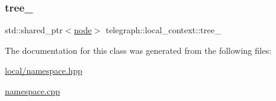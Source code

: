 \subsubsection{\texorpdfstring{tree\+\_\+}{tree\_}}
{\footnotesize\ttfamily std\+::shared\+\_\+ptr$<$\hyperlink{classtelegraph_1_1node}{node}$>$ telegraph\+::local\+\_\+context\+::tree\+\_\+\hspace{0.3cm}{\ttfamily [protected]}}



The documentation for this class was generated from the following files\+:\begin{DoxyCompactItemize}
\item 
\hyperlink{local_2namespace_8hpp}{local/namespace.\+hpp}\item 
\hyperlink{namespace_8cpp}{namespace.\+cpp}\end{DoxyCompactItemize}
